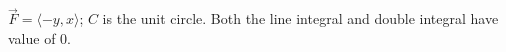 {$\vec F = \langle -y,x\rangle$; $C$ is the unit circle.
}
{Both the line integral and double integral have value of $0$.
}
